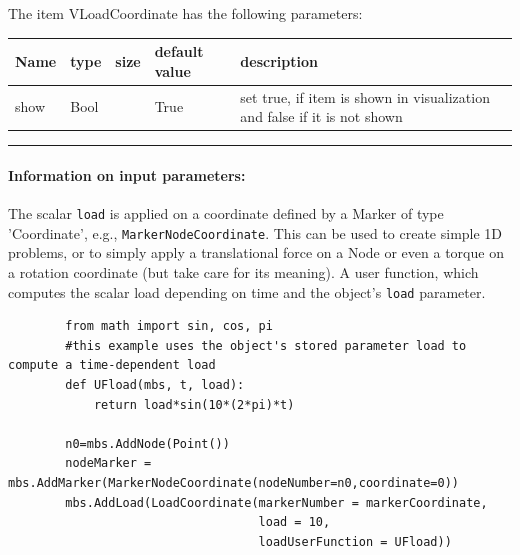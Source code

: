 \noindent The item VLoadCoordinate has the following parameters:
\begin{center}
  \footnotesize
  \begin{longtable}{| p{4.5cm} | p{2.5cm} | p{0.5cm} | p{2.5cm} | p{6cm} |}
    \hline
    \bf Name & \bf type & \bf size & \bf default value & \bf description \\ \hline
    show &     Bool &      &     True &     set true, if item is shown in visualization and false if it is not shown\\ \hline
\end{longtable}
\end{center}
\par\noindent\rule{\textwidth}{0.4pt}
\label{description_LoadCoordinate}
\paragraph{Information on input parameters:} 
\finishTable
 \noindent
    The scalar \texttt{load} is applied on a coordinate defined by a Marker of type 'Coordinate', e.g., \texttt{MarkerNodeCoordinate}.
    This can be used to create simple 1D problems, or to simply apply a translational force on a Node or even a torque
    on a rotation coordinate (but take care for its meaning).
    A user function, which computes the scalar load depending on time and the object's \texttt{load} parameter.
    \finishTable
    \userFunctionExample{}
    \pythonstyle\begin{lstlisting}
        from math import sin, cos, pi
        #this example uses the object's stored parameter load to compute a time-dependent load
        def UFload(mbs, t, load): 
            return load*sin(10*(2*pi)*t)

        n0=mbs.AddNode(Point())
        nodeMarker = mbs.AddMarker(MarkerNodeCoordinate(nodeNumber=n0,coordinate=0))
        mbs.AddLoad(LoadCoordinate(markerNumber = markerCoordinate,
                                   load = 10,
                                   loadUserFunction = UFload))
    \end{lstlisting}
